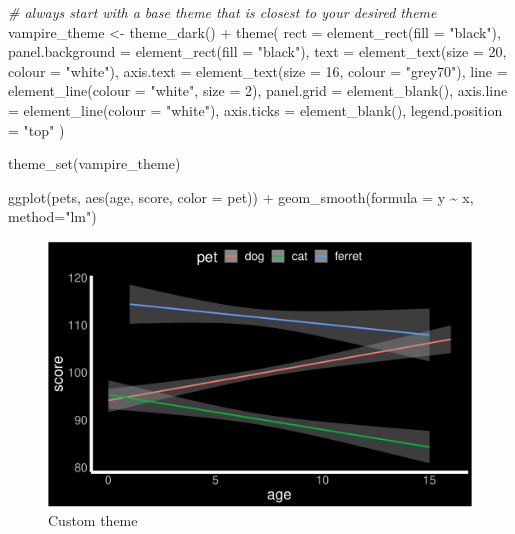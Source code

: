 \documentclass[
  oneside]{book}
\newenvironment{Shaded}{\begin{snugshade}}{\end{snugshade}}
\newcommand{\AttributeTok}[1]{\textcolor[rgb]{0.77,0.63,0.00}{#1}}
\newcommand{\CommentTok}[1]{\textcolor[rgb]{0.56,0.35,0.01}{\textit{#1}}}
\newcommand{\DecValTok}[1]{\textcolor[rgb]{0.00,0.00,0.81}{#1}}
\newcommand{\FunctionTok}[1]{\textcolor[rgb]{0.00,0.00,0.00}{#1}}
\newcommand{\NormalTok}[1]{#1}
\newcommand{\OtherTok}[1]{\textcolor[rgb]{0.56,0.35,0.01}{#1}}
\newcommand{\SpecialCharTok}[1]{\textcolor[rgb]{0.00,0.00,0.00}{#1}}
\newcommand{\StringTok}[1]{\textcolor[rgb]{0.31,0.60,0.02}{#1}}
\begin{document}
\begin{Shaded}
\begin{Highlighting}[]
\CommentTok{\# always start with a base theme that is closest to your desired theme}
\NormalTok{vampire\_theme }\OtherTok{\textless{}{-}} \FunctionTok{theme\_dark}\NormalTok{() }\SpecialCharTok{+}
  \FunctionTok{theme}\NormalTok{(}
    \AttributeTok{rect =} \FunctionTok{element\_rect}\NormalTok{(}\AttributeTok{fill =} \StringTok{"black"}\NormalTok{),}
    \AttributeTok{panel.background =} \FunctionTok{element\_rect}\NormalTok{(}\AttributeTok{fill =} \StringTok{"black"}\NormalTok{),}
    \AttributeTok{text =} \FunctionTok{element\_text}\NormalTok{(}\AttributeTok{size =} \DecValTok{20}\NormalTok{, }\AttributeTok{colour =} \StringTok{"white"}\NormalTok{),}
    \AttributeTok{axis.text =} \FunctionTok{element\_text}\NormalTok{(}\AttributeTok{size =} \DecValTok{16}\NormalTok{, }\AttributeTok{colour =} \StringTok{"grey70"}\NormalTok{),}
    \AttributeTok{line =} \FunctionTok{element\_line}\NormalTok{(}\AttributeTok{colour =} \StringTok{"white"}\NormalTok{, }\AttributeTok{size =} \DecValTok{2}\NormalTok{),}
    \AttributeTok{panel.grid =} \FunctionTok{element\_blank}\NormalTok{(),}
    \AttributeTok{axis.line =} \FunctionTok{element\_line}\NormalTok{(}\AttributeTok{colour =} \StringTok{"white"}\NormalTok{),}
    \AttributeTok{axis.ticks =} \FunctionTok{element\_blank}\NormalTok{(),}
    \AttributeTok{legend.position =} \StringTok{"top"}
\NormalTok{  )}

\FunctionTok{theme\_set}\NormalTok{(vampire\_theme)}

\FunctionTok{ggplot}\NormalTok{(pets, }\FunctionTok{aes}\NormalTok{(age, score, }\AttributeTok{color =}\NormalTok{ pet)) }\SpecialCharTok{+}
  \FunctionTok{geom\_smooth}\NormalTok{(}\AttributeTok{formula =}\NormalTok{ y }\SpecialCharTok{\textasciitilde{}}\NormalTok{ x, }\AttributeTok{method=}\StringTok{"lm"}\NormalTok{)}
\end{Highlighting}
\end{Shaded}

\begin{figure}

{\centering \includegraphics[width=0.9\linewidth]{images/custom-themes-1} 

}

\caption{Custom theme}\label{fig:custom-themes}
\end{figure}
\end{document}
